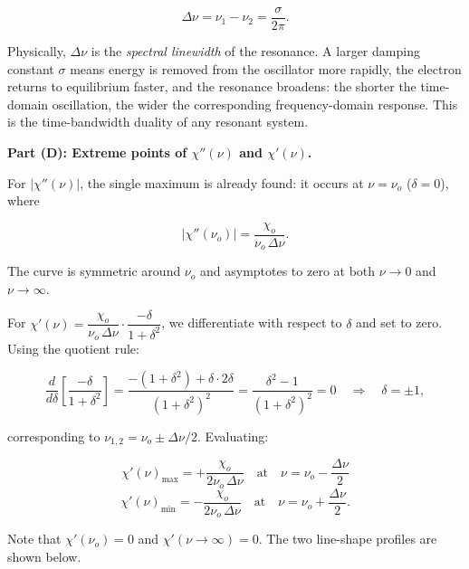 \begin{equation*}
  \boxed{\Delta\nu = \nu_1 - \nu_2 = \frac{\sigma}{2\pi}.}
\end{equation*}

Physically, $\Delta\nu$ is the \emph{spectral linewidth} of the resonance. A larger damping constant $\sigma$ means energy is removed from the oscillator more rapidly, the electron returns to equilibrium faster, and the resonance broadens: the shorter the time-domain oscillation, the wider the corresponding frequency-domain response. This is the time-bandwidth duality of any resonant system.

\textbf{Part (D): Extreme points of $\chi''(\nu)$ and $\chi'(\nu)$.}

For $|\chi''(\nu)|$, the single maximum is already found: it occurs at $\nu = \nu_o$ ($\delta = 0$), where

\begin{equation*}
  |\chi''(\nu_o)| = \frac{\chi_o}{\nu_o\,\Delta\nu}.
\end{equation*}

The curve is symmetric around $\nu_o$ and asymptotes to zero at both $\nu \to 0$ and $\nu \to \infty$.

For $\chi'(\nu) = \dfrac{\chi_o}{\nu_o\,\Delta\nu}\cdot\dfrac{-\delta}{1+\delta^2}$, we differentiate with respect to $\delta$ and set to zero. Using the quotient rule:

\begin{equation*}
  \frac{d}{d\delta}\!\left[\frac{-\delta}{1+\delta^2}\right]
  = \frac{-(1+\delta^2) + \delta\cdot 2\delta}{(1+\delta^2)^2}
  = \frac{\delta^2 - 1}{(1+\delta^2)^2} = 0
  \quad\Longrightarrow\quad \delta = \pm 1,
\end{equation*}

corresponding to $\nu_{1,2} = \nu_o \pm \Delta\nu/2$. Evaluating:

\begin{equation*}
  \boxed{\chi'(\nu)_{\max} = +\frac{\chi_o}{2\nu_o\,\Delta\nu}
  \quad\text{at}\quad \nu = \nu_o - \frac{\Delta\nu}{2}}
\end{equation*}
\begin{equation*}
  \boxed{\chi'(\nu)_{\min} = -\frac{\chi_o}{2\nu_o\,\Delta\nu}
  \quad\text{at}\quad \nu = \nu_o + \frac{\Delta\nu}{2}.}
\end{equation*}

Note that $\chi'(\nu_o) = 0$ and $\chi'(\nu \to \infty) = 0$. The two line-shape profiles are shown below.

